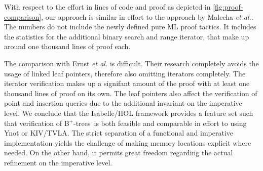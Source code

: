 \documentclass[runningheads]{llncs}
\newcommand{\btrees}{B$^+$-trees}
\begin{document}
With respect to the effort in lines of code and proof
as depicted in \cref{fig:proof-comparison},
our approach is similar in effort to the approach by Malecha \emph{et al.}.
The numbers do not include the newly defined pure ML proof tactics.
It includes the statistics for the additional binary search and range iterator,
that make up around one thousand lines of proof each.

The comparison with Ernst \emph{et al.} is difficult.
Their research completely avoids the usage of linked leaf pointers,
therefore also omitting iterators completely.
The iterator verification makes up a signifant amount of the proof
with at least one thousand lines of proof on its own.
The leaf pointers also affect the verification of point and insertion queries
due to the additional invariant on the imperative level.
We conclude that the Isabelle/HOL framework
provides a feature set
such that verification of \btrees\ is both feasible
and comparable in effort to using Ynot or KIV/TVLA.
The strict separation of a functional and imperative
implementation yields the challenge
of making memory locations explicit where needed.
On the other hand, it permits great freedom
regarding the actual refinement on the imperative level.
\renewcommand*{\thefootnote}{\fnsymbol{footnote}}
\end{document}
